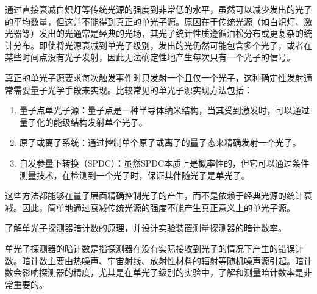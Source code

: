 \documentclass[dvipsnames, svgnames,a4paper,11pt]{article}
\begin{document}
	通过直接衰减白炽灯等传统光源的强度到非常低的水平，虽然可以减少发出的光子的平均数量，但这并不能得到真正的单光子源。原因在于传统光源（如白炽灯、激光器等）发出的光通常是经典的光场，其光子统计性质遵循泊松分布或更复杂的统计分布。即使将光源衰减到单光子级别，发出的光仍然可能包含多个光子，或者在某些时间点没有光子发射，因此无法确定性地产生每次只有一个光子的信号。

	真正的单光子源要求每次触发事件时只发射一个且仅一个光子，这种确定性发射通常需要量子光学手段来实现。比较常见的单光子源实现方法包括：
	\begin{enumerate}
		\item 量子点单光子源：量子点是一种半导体纳米结构，当其受到激发时，可以通过量子化的能级结构发射单个光子。
		\item 原子或离子系统：通过控制单个原子或离子的量子态来精确发射一个光子。
		\item 自发参量下转换（SPDC）：虽然SPDC本质上是概率性的，但它可以通过条件测量技术，在检测到一个光子时，保证其伴随光子是单光子。
	\end{enumerate}

	这些方法都能够在量子层面精确控制光子的产生，而不是依赖于经典光源的统计衰减。因此，简单地通过衰减传统光源的强度不能产生真正意义上的单光子源。







\begin{question}
	了解单光子探测器暗计数的原理，并设计实验装置测量探测器的暗计数率。
\end{question}



	单光子探测器的暗计数是指探测器在没有实际接收到光子的情况下产生的错误计数。暗计数主要由热噪声、宇宙射线、放射性材料的辐射等随机噪声源引起。暗计数会影响探测器的精度，尤其是在单光子级别的实验中，了解和测量暗计数率是非常重要的。
\end{document}
